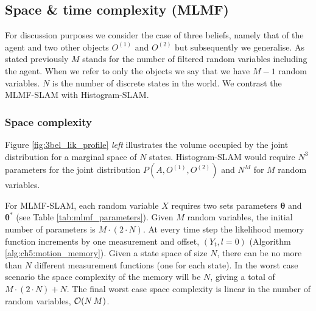 \subsection{Space \& time complexity (MLMF)}\label{ch5:space_time_complexity_MLMF}

For discussion purposes we consider the case of three beliefs, namely that of the agent and two other objects $O^{(1)}$ and $O^{(2)}$ but 
subsequently we generalise. As stated previously $M$ stands for the number of filtered random variables including the agent. When we refer 
to only the objects we say that we have $M-1$ random variables. $N$ is the number of discrete states in the world. We contrast
the MLMF-SLAM with Histogram-SLAM.



\subsubsection{Space complexity}

Figure \ref{fig:3bel_lik_profile} \textit{left} illustrates the volume occupied by the joint distribution for a marginal space of $N$ states. 
Histogram-SLAM would require $N^3$ parameters for the joint distribution $P(A,O^{(1)},O^{(2)})$ and $N^{M}$ for $M$ random variables. 

For MLMF-SLAM, each random variable $X$ requires two sets parameters $\boldsymbol{\theta}$ and $\boldsymbol{\theta}^*$ 
(see Table \ref{tab:mlmf_parameters}). Given
$M$ random variables, the initial number of parameters is $M \cdot (2 \cdot N)$.
At every time step the likelihood memory function increments by one measurement and offset, $(Y_t,l=0)$ (Algorithm \ref{alg:ch5:motion_memory}).
Given a state space of size $N$, there can be no more than $N$ different measurement functions (one for each state). In
the worst case scenario the space complexity of the memory will be $N$, giving a total of $M \cdot (2 \cdot N) + N$. 
The final worst case space complexity is linear in the number of random variables, $\operatorname{\mathcal{O}}(N\,M)$. 

